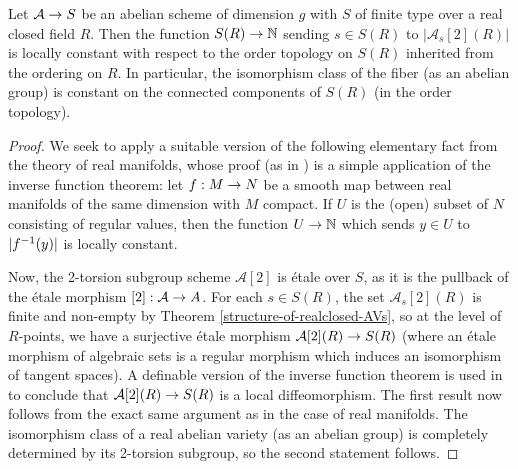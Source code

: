 \begin{proposition}
\label{deformation}
Let $\mathcal{A}\rightarrow S$ be an abelian scheme of dimension $g$ with $S$ of finite type over a real closed field $R$. Then the function $S(R)\rightarrow \mathbb{N}$ sending $s\in S(R)$ to $|\mathcal{A}_s[2](R)|$ is locally constant with respect to the order topology on $S(R)$ inherited from the ordering on $R$. In particular, the isomorphism class of the fiber (as an abelian group) is constant on the connected components of $S(R)$ (in the order topology).
\end{proposition}
\begin{proof}
We seek to apply a suitable version of the following elementary fact from the theory of real manifolds, whose proof (as in \cite{milnor}) is a simple application of the inverse function theorem: let $f:M\rightarrow N$ be a smooth map between real manifolds of the same dimension with $M$ compact. If $U$ is the (open) subset of $N$ consisting of regular values, then the function $U\rightarrow \mathbb{N}$ which sends $y\in U$ to $|f^{-1}(y)|$ is locally constant. 

Now, the 2-torsion subgroup scheme $\mathcal{A}[2]$ is \'etale over $S$, as it is the pullback of the \'etale morphism $[2]:\mathcal{A}\rightarrow A$. For each $s\in S(R)$, the set $\mathcal{A}_s[2](R)$ is finite and non-empty by Theorem \ref{structure-of-realclosed-AVs}, so at the level of $R$-points, we have a surjective \'etale morphism $\mathcal{A}[2](R)\rightarrow S(R)$ (where an \'etale morphism of algebraic sets is a regular morphism which induces an isomorphism of tangent spaces). A definable version of the inverse function theorem is used in \cite[Proposition 8.1.2]{real} to conclude that $\mathcal{A}[2](R)\rightarrow S(R)$ is a local diffeomorphism. The first result now follows from the exact same argument as in the case of real manifolds. The isomorphism class of a real abelian variety (as an abelian group) is completely determined by its 2-torsion subgroup, so the second statement follows.
\end{proof}